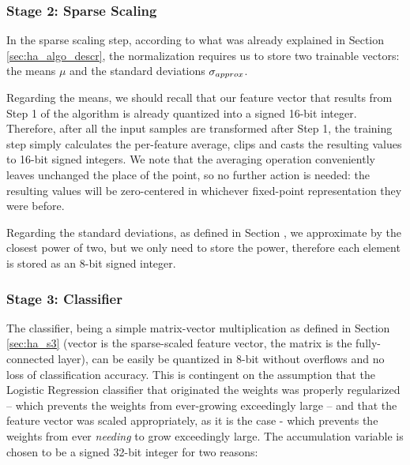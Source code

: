 
        \subsubsection{Stage 2: Sparse Scaling}\label{sec:im_nanohydra_qnt_s2}

        In the sparse scaling step, according to what was already explained in Section \ref{sec:ha_algo_descr}, the normalization requires us to store two trainable vectors: the means $\mu$ and the standard deviations $\sigma\sb{approx}$.
       
        Regarding the means, we should recall that our feature vector that results from Step 1 of the algorithm is already quantized into a signed 16-bit integer.
        Therefore, after all the input samples are transformed after Step 1, the training step simply calculates the per-feature average, clips and casts the resulting
        values to 16-bit signed integers. We note that the averaging operation conveniently leaves unchanged the place of the point, so no further action is needed: the resulting 
        values will be zero-centered in whichever fixed-point representation they were before.
        
        Regarding the standard deviations, as defined in Section \label{sec:im_nanohydra_algopt_s2}, we approximate by the closest power of two, but we only need to store the power, therefore each element
        is stored as an 8-bit signed integer.

        \subsubsection{Stage 3: Classifier}\label{sec:im_nanohydra_qnt_s3}

        The classifier, being a simple matrix-vector multiplication as defined in Section \ref{sec:ha_s3} (vector is the sparse-scaled feature vector, the matrix is the fully-connected layer), can be easily
        be quantized in 8-bit without overflows and no loss of classification accuracy. This is contingent on the assumption that the Logistic Regression classifier that originated the weights was properly 
        regularized -- which prevents the weights from ever-growing exceedingly large -- and that the feature vector was scaled appropriately, as it is the case - which prevents the weights from ever \emph{needing}
        to grow exceedingly large. The accumulation variable is chosen to be a signed 32-bit integer for two reasons:
        
